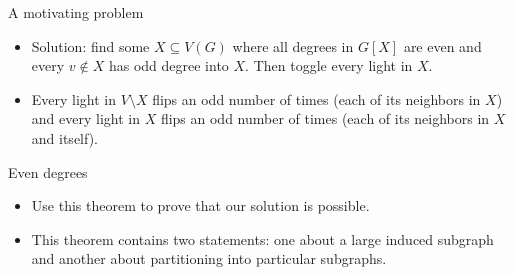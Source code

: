 \documentclass{beamer}
\theoremstyle{plain}
\newtheorem{exercise}[theorem]{Exercise}
\begin{document}
	\begin{frame}{A motivating problem}
		\begin{itemize}
			\begin{exercise}[L. Lov\'asz, T. Gallai - 1979]
				Assume that at each vertex of a graph there is a light that is turned on.
				Toggling any light toggles all of its neighbors as well.
				Turn off all of the lights.
			\end{exercise}\pause


			\item Solution: find some $X\subseteq V(G)$ where all degrees in $G[X]$ are even and every $v\notin X$ has odd degree into $X$.
			Then toggle every light in $X$.

			\pause

			\item Every light in $V\setminus X$ flips an odd number of times (each of its neighbors in $X$) and every light in $X$ flips an odd number of times (each of its neighbors in $X$ and itself).


		\end{itemize}	
	\end{frame}


	\begin{frame}{Even degrees}
		\begin{itemize}
			\begin{theorem}
				(Stated as an exercise in Lov\'asz' book).
				Let $G = (V, E)$ be any graph.
				Then $G$ admits a partitioning of its vertex set into two parts, $V = V_1 \cup V_2$, so that each vertex in $G[V_1]$ and each vertex in $G[V_2]$ has even degree.
				In particular, any graph on $n$ vertices has an even subgraph of order at least $n/2$.
			\end{theorem}

			\pause

			\item Use this theorem to prove that our solution is possible.

			\pause

			\item This theorem contains two statements: one about a large induced subgraph and another about partitioning into particular subgraphs.
		\end{itemize}
	\end{frame}
\end{document}
